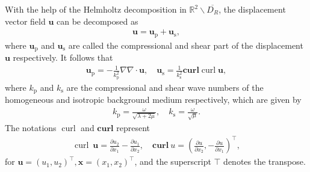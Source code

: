 \documentclass[11pt,reqno,oneside]{amsart}
\theoremstyle{definition}
\theoremstyle{remark}
\numberwithin{equation}{section}
\numberwithin{equation}{section}
\theoremstyle{remark}
\begin{document}
With the help of the Helmholtz decomposition in $ \mathbb{R}^2\backslash \overline{D_R} $, the displacement vector field $ \mathbf{u} $ can be decomposed as
\begin{align*} 
	\mathbf{u}=\mathbf{u}_{\mathrm{p}}+\mathbf{u}_{\mathrm{s}},
\end{align*}
where $ \mathbf{u}_{\mathrm{p}} $ and $ \mathbf{u}_{\mathrm{s}} $ are called the compressional and shear part of the displacement $ \mathbf{u} $ respectively. It follows that
\begin{align*}
	\mathbf{u}_{\mathrm{p}} = - \frac{1}{k_{\mathrm{p}}^2} \nabla \nabla \cdot \mathbf{u}, \quad \mathbf{u}_{\mathrm{s}} = \frac{1}{k_{\mathrm{s}}^2} \textbf{curl} \operatorname{curl} \mathbf{u} ,
\end{align*}
where $ k_{\mathrm{p}} $ and $ k_{\mathrm{s}} $ are the compressional and shear wave numbers of the homogeneous and isotropic background medium respectively, which are given by 
\begin{align} \label{eq_introduction_kpks} 
	k_{\mathrm{p}} = \frac{\omega}{\sqrt{\lambda + 2\mu}}, \quad k_{\mathrm{s}} = \frac{\omega}{\sqrt{\mu}}.
\end{align}
The notations $ \operatorname{curl} $ and $ \textbf{curl} $ represent 
\begin{align*}
	\operatorname{curl}\ \mathbf{u} = \frac{\partial u_2}{\partial x_1} - \frac{\partial u_1}{\partial x_2}, \quad \textbf{curl}\ u = \left( \frac{\partial u}{\partial x_2}, -\frac{\partial u}{\partial x_1} \right)^{\top}, 
\end{align*}
for $ \mathbf{u} = \left(u_1, u_2\right)^{\top}, \mathbf{x} = \left(x_1, x_2\right)^{\top} $, and the superscript $ \top $ denotes the transpose. 
\end{document}
